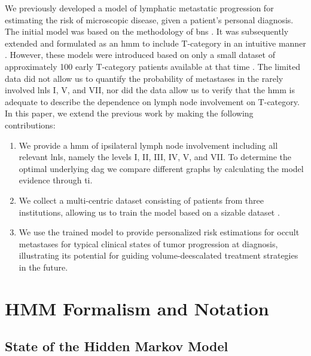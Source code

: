\documentclass[twocolumn]{aastex631}
\begin{document}
We previously developed a model of lymphatic metastatic progression for estimating the risk of microscopic disease, given a patient's personal diagnosis. The initial model was based on the methodology of \glspl{bn} \citep{pouymayou_bayesian_2019}. It was subsequently extended and formulated as an \gls{hmm} to include T-category in an intuitive manner \citep{ludwig_hidden_2021}. However, these models were introduced based on only a small dataset of approximately 100 early T-category patients available at that time \citep{sanguineti_defining_2009}. The limited data did not allow us to quantify the probability of metastases in the rarely involved \glspl{lnl} I, V, and VII, nor did the data allow us to verify that the \gls{hmm} is adequate to describe the dependence on lymph node involvement on T-category. In this paper, we extend the previous work \citep{ludwig_hidden_2021} by making the following contributions:
\begin{enumerate}
    \item We provide a \gls{hmm} of ipsilateral lymph node involvement including all relevant \glspl{lnl}, namely the levels I, II, III, IV, V, and VII. To determine the optimal underlying \gls{dag} we compare different graphs by calculating the model evidence through \gls{ti}.
    \item We collect a multi-centric dataset consisting of  patients from three institutions, allowing us to train the model based on a sizable dataset \citep{ludwig_dataset_2022,ludwig_multi-centric_2023}.
    \item We use the trained model to provide personalized risk estimations for occult metastases for typical clinical states of tumor progression at diagnosis, illustrating its potential for guiding volume-deescalated treatment strategies in the future. 
\end{enumerate}



\section{HMM Formalism and Notation}
\label{sec:formalism}



\subsection{State of the Hidden Markov Model}
\label{subsec:formalism:state}
\end{document}
